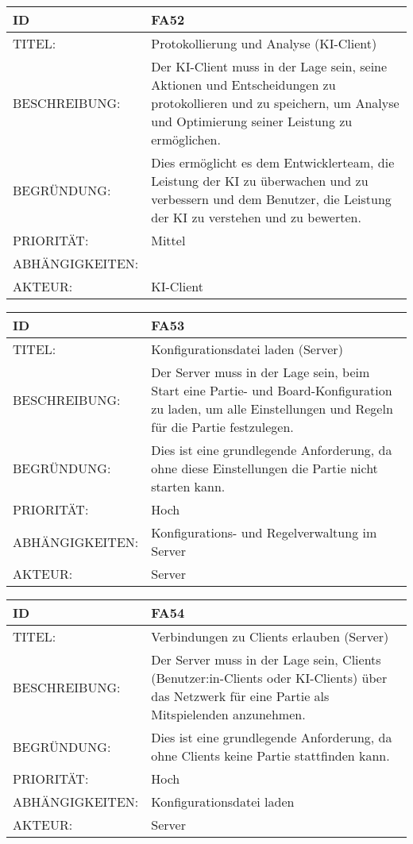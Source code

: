 \documentclass{uulm-assignment}
\begin{document}
    \begin{tabularx}{\textwidth}{|l|X |} \hline
        \textbf{ID} & \textbf{FA52} \\
        \hline
        TITEL: & Protokollierung und Analyse (KI-Client)\\
        \hline
        BESCHREIBUNG: &  Der KI-Client muss in der Lage sein, seine Aktionen und Entscheidungen zu protokollieren und zu speichern, um Analyse und Optimierung seiner Leistung zu ermöglichen.
        \\
        \hline
        BEGRÜNDUNG: & Dies ermöglicht es dem Entwicklerteam, die Leistung der KI zu überwachen und zu verbessern und dem Benutzer, die Leistung der KI zu verstehen und zu bewerten. \\
        \hline
        PRIORITÄT: & Mittel \\
        \hline
        ABHÄNGIGKEITEN: &  \\
        \hline
        AKTEUR: & KI-Client\\
        \hline
    \end{tabularx}
    
    \begin{tabularx}{\textwidth}{|l|X |} \hline
        \textbf{ID} & \textbf{FA53} \\
        \hline
        TITEL: & Konfigurationsdatei laden (Server)\\
        \hline
        BESCHREIBUNG: &  Der Server muss in der Lage sein, beim Start eine Partie- und Board-Konfiguration zu laden, um alle Einstellungen und Regeln für die Partie festzulegen. 
        \\
        \hline
        BEGRÜNDUNG: & Dies ist eine grundlegende Anforderung, da ohne diese Einstellungen die Partie nicht starten kann. \\
        \hline
        PRIORITÄT: & Hoch \\
        \hline
        ABHÄNGIGKEITEN: &  Konfigurations- und Regelverwaltung im Server \\
        \hline
        AKTEUR: & Server\\
        \hline
    \end{tabularx}
    
    \begin{tabularx}{\textwidth}{|l|X |} \hline
        \textbf{ID} & \textbf{FA54} \\
        \hline
        TITEL: & Verbindungen zu Clients erlauben (Server)\\
        \hline
        BESCHREIBUNG: & Der Server muss in der Lage sein, Clients (Benutzer:in-Clients oder KI-Clients) über das Netzwerk für eine Partie als Mitspielenden anzunehmen. 
        \\
        \hline
        BEGRÜNDUNG: & Dies ist eine grundlegende Anforderung, da ohne Clients keine Partie stattfinden kann.  \\
        \hline
        PRIORITÄT: & Hoch\\
        \hline
        ABHÄNGIGKEITEN: & Konfigurationsdatei laden \\
        \hline
        AKTEUR: & Server\\
        \hline
    \end{tabularx}
    
\end{document}
